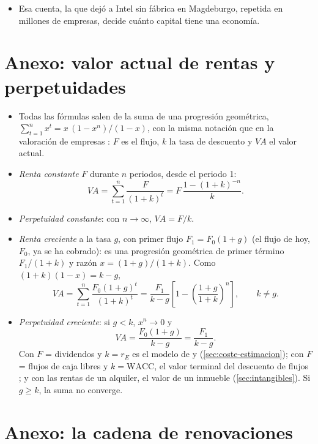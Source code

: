 \documentclass[11pt]{article}
\begin{document}
\begin{itemize}
\begin{itemize}
  \item Esa cuenta, la que dejó a Intel sin fábrica en Magdeburgo, repetida en millones de empresas, decide cuánto capital tiene una economía.
  \end{itemize}
\end{itemize}

\clearpage
\appendix

\section{Anexo: valor actual de rentas y perpetuidades}\label{anexo:rentas}

\begin{itemize}
\item Todas las fórmulas salen de la suma de una progresión geométrica, $\sum_{t=1}^{n}x^t=x\,(1-x^n)/(1-x)$, con la misma notación que en la valoración de empresas : $F$ es el flujo, $k$ la tasa de descuento y $VA$ el valor actual.
\item \emph{Renta constante} $F$ durante $n$ periodos, desde el periodo 1:
  \[
  VA=\sum_{t=1}^{n}\frac{F}{(1+k)^t}=F\,\frac{1-(1+k)^{-n}}{k}.
  \]
\item \emph{Perpetuidad constante}: con $n\to\infty$, $VA=F/k$.
\item \emph{Renta creciente} a la tasa $g$, con primer flujo $F_1=F_0(1+g)$ (el flujo de hoy, $F_0$, ya se ha cobrado): es una progresión geométrica de primer término $F_1/(1+k)$ y razón $x=(1+g)/(1+k)$. Como $(1+k)(1-x)=k-g$,
  \[
  VA=\sum_{t=1}^{n}\frac{F_0(1+g)^{t}}{(1+k)^t}=\frac{F_1}{k-g}\left[1-\left(\frac{1+g}{1+k}\right)^{n}\right],\qquad k\neq g.
  \]
\item \emph{Perpetuidad creciente}: si $g<k$, $x^n\to0$ y
  \[
  VA=\frac{F_0(1+g)}{k-g}=\frac{F_1}{k-g}.
  \]
  Con $F$ = dividendos y $k=r_E$ es el modelo de  y  (\ref{sec:coste-estimacion}); con $F$ = flujos de caja libres y $k=\mathrm{WACC}$, el valor terminal del descuento de flujos ; y con las rentas de un alquiler, el valor de un inmueble (\ref{sec:intangibles}). Si $g\geq k$, la suma no converge.\findemo
\end{itemize}

\section{Anexo: la cadena de renovaciones}\label{anexo:renovaciones}
\end{document}
